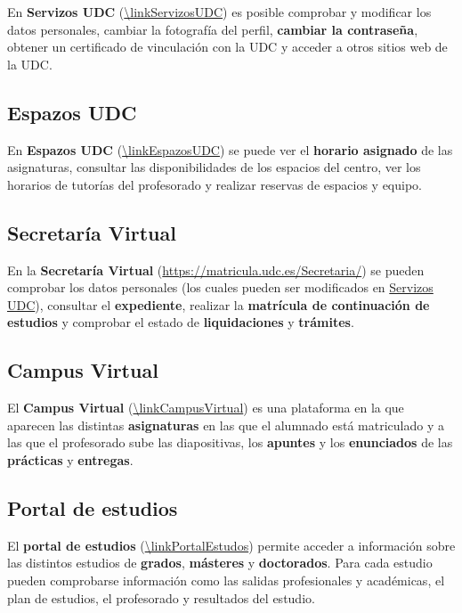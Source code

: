 En \textbf{Servizos UDC} (\url{\linkServizosUDC}) es posible comprobar y modificar los datos personales, cambiar la fotografía del perfil, \textbf{cambiar la contraseña}, obtener un certificado de vinculación con la \acrshort{UDC} y acceder a otros sitios web de la \acrshort{UDC}.

\subsection{Espazos UDC}

En \textbf{Espazos UDC} (\url{\linkEspazosUDC}) se puede ver el \textbf{horario asignado} de las asignaturas, consultar las disponibilidades de los espacios del centro, ver los horarios de tutorías del profesorado y realizar reservas de espacios y equipo. 

\subsection{Secretaría Virtual}

En la \textbf{Secretaría Virtual} (\url{https://matricula.udc.es/Secretaria/}) se pueden comprobar los datos personales (los cuales pueden ser modificados en \href{\linkServizosUDC}{Servizos UDC}), consultar el \textbf{expediente}, realizar la \textbf{matrícula de continuación de estudios} y comprobar el estado de \textbf{liquidaciones} y \textbf{trámites}.

\subsection{Campus Virtual}

El \textbf{Campus Virtual} (\url{\linkCampusVirtual}) es una plataforma en la que aparecen las distintas \textbf{asignaturas} en las que el alumnado está matriculado y a las que el profesorado sube las diapositivas, los \textbf{apuntes} y los \textbf{enunciados} de las \textbf{prácticas} y \textbf{entregas}.

\subsection{Portal de estudios}

El \textbf{portal de estudios} (\url{\linkPortalEstudos}) permite acceder a información sobre las distintos estudios de \textbf{grados}, \textbf{másteres} y \textbf{doctorados}. Para cada estudio pueden comprobarse información como las salidas profesionales y académicas, el plan de estudios, el profesorado y resultados del estudio.
